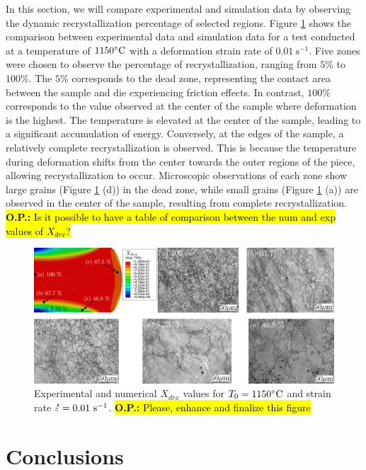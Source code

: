 \documentclass[metals,article,submit,pdftex,moreauthors]{Definitions/mdpi}
\DeclareRobustCommand{\mdot}[1]{\accentset{\mbox{\bfseries .}}{#1}}
\DeclareRobustCommand{\ps}{\text{s}^{-1}}
\DeclareRobustCommand{\OP}[1]{\begingroup\sethlcolor{VWyellow}\textcolor{red}{\hl{\textbf{O.P.:} #1}}\endgroup}
\begin{document}
In this section, we will compare experimental and simulation data by observing the dynamic recrystallization percentage of selected regions.
Figure \ref{fig:expNumDRX} shows the comparison between experimental data and simulation data for a test conducted at a temperature of $1150\celsius$ with a deformation strain rate of $0.01~\ps$.
Five zones were chosen to observe the percentage of recrystallization, ranging from $5\%$ to $100\%$.
The $5\%$ corresponds to the dead zone, representing the contact area between the sample and die experiencing friction effects.
In contrast, $100\%$ corresponds to the value observed at the center of the sample where deformation is the highest.
The temperature is elevated at the center of the sample, leading to a significant accumulation of energy.
Conversely, at the edges of the sample, a relatively complete recrystallization is observed. This is because the temperature during deformation shifts from the center towards the outer regions of the piece, allowing recrystallization to occur.
Microscopic observations of each zone show large grains (Figure \ref{fig:expNumDRX} (d)) in the dead zone, while small grains (Figure \ref{fig:expNumDRX} (a)) are observed in the center of the sample, resulting from complete recrystallization.
\OP{Is it possible to have a table of comparison between the num and exp values of $X_{drx}$?}
\begin{figure}[H]
\centering
\includegraphics[width=0.98\columnwidth]{Figures/expNumDRX}
\caption{Experimental and numerical $X_{drx}$ values for $T_0=1150\celsius$ and strain rate $\mdot{\varepsilon}=0.01~\ps$. \OP{Please, enhance and finalize this figure}}
\label{fig:expNumDRX}
\end{figure}

\section{Conclusions\label{sec:Conclusions}}
\end{document}
